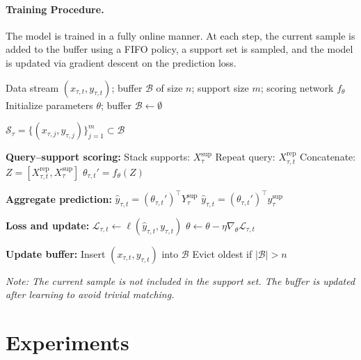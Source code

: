 \documentclass{article}
\begin{document}
\paragraph{Training Procedure.}
The model is trained in a fully online manner. At each step, the current sample is added to the buffer using a FIFO policy, a support set is sampled, and the model is updated via gradient descent on the prediction loss.
\begin{algorithm}[H]
\caption{Query-Only Attention (QOA) with Replay Buffer}
\label{alg:qoa}
\begin{algorithmic}[1]
\Require Data stream $(x_{\tau,t}, y_{\tau,t})$; buffer $\mathcal{B}$ of size $n$; support size $m$; scoring network $f_\theta$
\State Initialize parameters $\theta$; buffer $\mathcal{B} \gets \emptyset$


    \State $\mathcal{S}_{\tau} = \{(x_{\tau,j}, y_{\tau,j})\}_{j=1}^{m} \subset \mathcal{B}$

    \State \textbf{Query--support scoring:}
    \State Stack supports: $X_{\tau}^{\mathrm{sup}}$
    \State Repeat query: $X_{\tau,t}^{\mathrm{rep}}$
    \State Concatenate: $Z = [X_{\tau,t}^{\mathrm{rep}}, X_{\tau}^{\mathrm{sup}}]$
    \State $\theta_{\tau,t}' = f_\theta(Z)$

    \State \textbf{Aggregate prediction:}
        \State $\hat{y}_{\tau,t} = (\theta_{\tau,t}')^\top Y_{\tau}^{\mathrm{sup}}$
    \Else
        \State $\hat{y}_{\tau,t} = (\theta_{\tau,t}')^\top y_{\tau}^{\mathrm{sup}}$
    \EndIf

    \State \textbf{Loss and update:}
    \State $\mathcal{L}_{\tau,t} \gets \ell(\hat{y}_{\tau,t}, y_{\tau,t})$
    \State $\theta \gets \theta - \eta \nabla_\theta \mathcal{L}_{\tau,t}$

    \State \textbf{Update buffer:}
    \State Insert $(x_{\tau,t}, y_{\tau,t})$ into $\mathcal{B}$
    \State Evict oldest if $|\mathcal{B}| > n$

\EndFor

\Statex \textit{Note: The current sample is not included in the support set. The buffer is updated after learning to avoid trivial matching.}

\end{algorithmic}
\end{algorithm}


\section{Experiments}
\label{sec:experiment}
\end{document}
